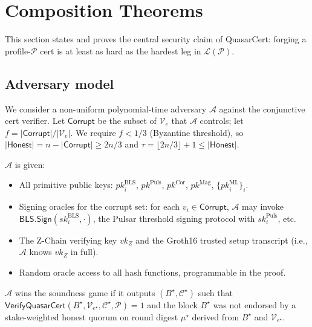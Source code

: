\section{Composition Theorems}
\label{sec:composition}

This section states and proves the central security claim of
QuasarCert: forging a profile-$\mathcal{P}$ cert is at least as hard
as the hardest leg in $\mathcal{L}(\mathcal{P})$.

\subsection{Adversary model}

We consider a non-uniform polynomial-time adversary $\mathcal{A}$
against the conjunctive cert verifier. Let $\mathsf{Corrupt}$ be the
subset of $\mathcal{V}_e$ that $\mathcal{A}$ controls; let
$f = |\mathsf{Corrupt}|/|\mathcal{V}_e|$. We require $f < 1/3$
(Byzantine threshold), so $|\mathsf{Honest}| = n - |\mathsf{Corrupt}|
\geq 2n/3$ and $\tau = \lfloor 2n/3 \rfloor + 1 \leq |\mathsf{Honest}|$.

$\mathcal{A}$ is given:
\begin{itemize}[leftmargin=2em,nosep]
\item All primitive public keys: $\mathit{pk}_i^{\mathrm{BLS}}$,
      $\mathit{pk}^{\mathrm{Puls}}$, $\mathit{pk}^{\mathrm{Cor}}$,
      $\mathit{pk}^{\mathrm{Mag}}$, $\{\mathit{pk}_i^{\mathrm{ML}}\}_i$.
\item Signing oracles for the corrupt set: for each $v_i \in \mathsf{Corrupt}$,
      $\mathcal{A}$ may invoke $\mathsf{BLS.Sign}(\mathit{sk}_i^{\mathrm{BLS}},
      \cdot)$, the Pulsar threshold signing protocol with
      $\mathit{sk}_i^{\mathrm{Puls}}$, etc.
\item The Z-Chain verifying key $\mathit{vk}_Z$ and the Groth16 trusted
      setup transcript (i.e., $\mathcal{A}$ knows $\mathit{vk}_Z$ in
      full).
\item Random oracle access to all hash functions, programmable in the
      proof.
\end{itemize}

$\mathcal{A}$ wins the soundness game if it outputs
$(B^{\star}, \mathcal{C}^{\star})$ such that
$\textsf{VerifyQuasarCert}(B^{\star}, \mathcal{V}_{e^{\star}},
\mathcal{C}^{\star}, \mathcal{P}) = 1$ and the block $B^{\star}$ was
not endorsed by a stake-weighted honest quorum on round digest
$\mu^{\star}$ derived from $B^{\star}$ and $\mathcal{V}_{e^{\star}}$.

